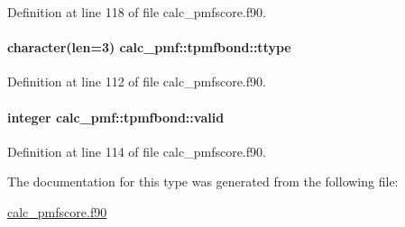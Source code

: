 Definition at line 118 of file calc\-\_\-pmfscore.\-f90.

\hypertarget{structcalc__pmf_1_1tpmfbond_a733ecbca55bdcb850264eefbff30e12c}{
\paragraph[{ttype}]{\setlength{\rightskip}{0pt plus 5cm}character(len=3) calc\-\_\-pmf\-::tpmfbond\-::ttype}}\label{structcalc__pmf_1_1tpmfbond_a733ecbca55bdcb850264eefbff30e12c}


Definition at line 112 of file calc\-\_\-pmfscore.\-f90.

\hypertarget{structcalc__pmf_1_1tpmfbond_abf0e0b1c749fefd233a8b7048dad0243}{
\paragraph[{valid}]{\setlength{\rightskip}{0pt plus 5cm}integer calc\-\_\-pmf\-::tpmfbond\-::valid}}\label{structcalc__pmf_1_1tpmfbond_abf0e0b1c749fefd233a8b7048dad0243}


Definition at line 114 of file calc\-\_\-pmfscore.\-f90.



The documentation for this type was generated from the following file\-:\begin{DoxyCompactItemize}
\item 
\hyperlink{calc__pmfscore_8f90}{calc\-\_\-pmfscore.\-f90}\end{DoxyCompactItemize}
